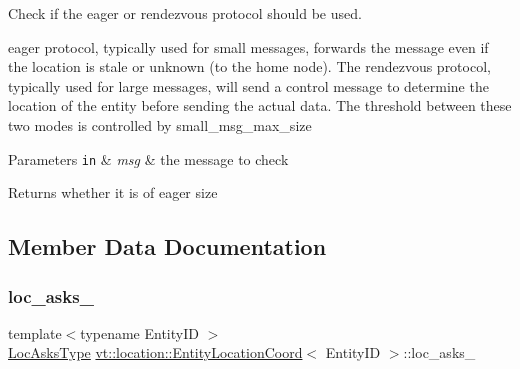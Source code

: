 Check if the eager or rendezvous protocol should be used. 

eager protocol, typically used for small messages, forwards the message even if the location is stale or unknown (to the home node). The rendezvous protocol, typically used for large messages, will send a control message to determine the location of the entity before sending the actual data. The threshold between these two modes is controlled by {\ttfamily small\+\_\+msg\+\_\+max\+\_\+size} 


\begin{DoxyParams}[1]{Parameters}
\mbox{\tt in}  & {\em msg} & the message to check\\
\hline
\end{DoxyParams}
\begin{DoxyReturn}{Returns}
whether it is of eager size 
\end{DoxyReturn}


\subsection{Member Data Documentation}
\mbox{\label{structvt_1_1location_1_1_entity_location_coord_a52abbeb79fc2d24889a05ac87ad6e7f5}} 
\subsubsection{\texorpdfstring{loc\+\_\+asks\+\_\+}{loc\_asks\_}}
{\footnotesize\ttfamily template$<$typename Entity\+ID $>$ \\
\hyperlink{structvt_1_1location_1_1_entity_location_coord_a492ca5404229c05923f69bae396f2ac4}{Loc\+Asks\+Type} \hyperlink{structvt_1_1location_1_1_entity_location_coord}{vt\+::location\+::\+Entity\+Location\+Coord}$<$ Entity\+ID $>$\+::loc\+\_\+asks\+\_\+\hspace{0.3cm}{\ttfamily [private]}}

\mbox{\label{structvt_1_1location_1_1_entity_location_coord_a17f116f6581c4f67c2c5450db40f70a6}} 
